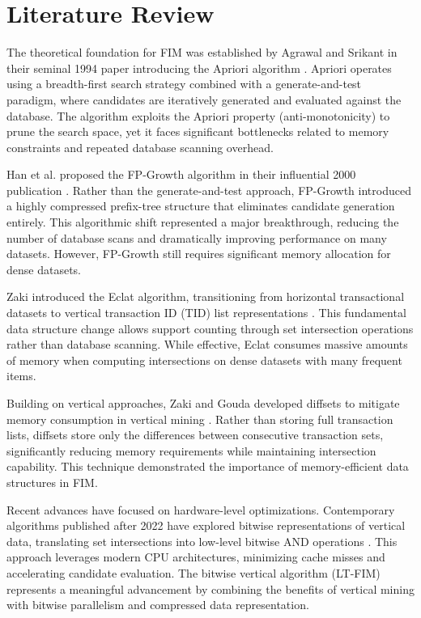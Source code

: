 \documentclass[conference]{IEEEtran}
\begin{document}
\section{Literature Review}

The theoretical foundation for FIM was established by Agrawal and Srikant in their seminal 1994 paper introducing the Apriori algorithm \cite{b1}. Apriori operates using a breadth-first search strategy combined with a generate-and-test paradigm, where candidates are iteratively generated and evaluated against the database. The algorithm exploits the Apriori property (anti-monotonicity) to prune the search space, yet it faces significant bottlenecks related to memory constraints and repeated database scanning overhead.

Han et al. proposed the FP-Growth algorithm in their influential 2000 publication \cite{b2}. Rather than the generate-and-test approach, FP-Growth introduced a highly compressed prefix-tree structure that eliminates candidate generation entirely. This algorithmic shift represented a major breakthrough, reducing the number of database scans and dramatically improving performance on many datasets. However, FP-Growth still requires significant memory allocation for dense datasets.

Zaki introduced the Eclat algorithm, transitioning from horizontal transactional datasets to vertical transaction ID (TID) list representations \cite{b3}. This fundamental data structure change allows support counting through set intersection operations rather than database scanning. While effective, Eclat consumes massive amounts of memory when computing intersections on dense datasets with many frequent items.

Building on vertical approaches, Zaki and Gouda developed diffsets to mitigate memory consumption in vertical mining \cite{b4}. Rather than storing full transaction lists, diffsets store only the differences between consecutive transaction sets, significantly reducing memory requirements while maintaining intersection capability. This technique demonstrated the importance of memory-efficient data structures in FIM.

Recent advances have focused on hardware-level optimizations. Contemporary algorithms published after 2022 have explored bitwise representations of vertical data, translating set intersections into low-level bitwise AND operations \cite{b6}. This approach leverages modern CPU architectures, minimizing cache misses and accelerating candidate evaluation. The bitwise vertical algorithm (LT-FIM) represents a meaningful advancement by combining the benefits of vertical mining with bitwise parallelism and compressed data representation.
\end{document}
